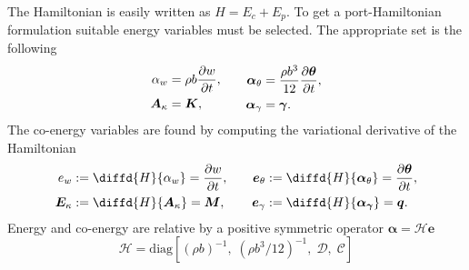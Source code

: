 \documentclass{ifacconf}
\begin{document}
The Hamiltonian  is easily written as $H = E_c + E_p$. To get a port-Hamiltonian formulation suitable energy variables must be selected. The appropriate set is the following
\begin{equation}
\begin{aligned}
\alpha_w &= \rho b \diffp{w}{t}, \\
\bm{A}_{\kappa} &= \bm{K}, \\
\end{aligned} \qquad
\begin{aligned}
\bm\alpha_{\theta} &= \frac{\rho b^3}{12} \diffp{\bm{\theta}}{t}, \\
\bm\alpha_{\gamma} &= \bm{\gamma}. \\
\end{aligned}
\end{equation}
The co-energy variables are found by computing the variational derivative of the Hamiltonian
\begin{equation}
\begin{aligned}
e_w &:= \diffd{H}{\alpha_w} = \diffp{w}{t},  \\
\bm{E}_{\kappa} &:= \diffd{H}{\bm{A}_{\kappa}} = \bm{M}, \\
\end{aligned} \qquad
\begin{aligned}
\bm{e}_{\theta} &:= \diffd{H}{\bm\alpha_{\theta}} = \diffp{\bm{\theta}}{t}, \\
\bm{e}_{\gamma} &:= \diffd{H}{\bm{\alpha}_{\bm{\gamma}}} = \bm{q}. \\
\end{aligned}
\end{equation}
Energy and co-energy are relative by a positive symmetric operator $\bm{\alpha} = \mathcal{H} \bm{e}$
\begin{equation}
\mathcal{H} = \mathrm{diag}[(\rho b)^{-1}, \; (\rho b^3/12)^{-1} , \; \mathcal{D}, \; \mathcal{C}]
\end{equation}
\end{document}
